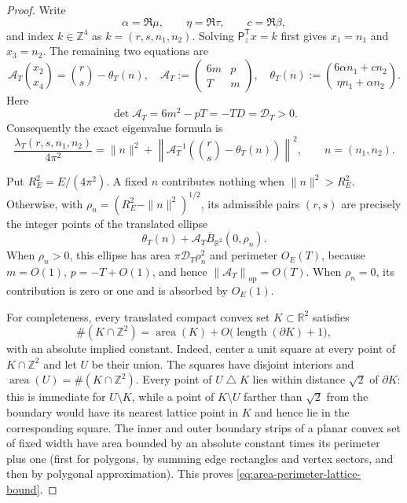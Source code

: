 \documentclass[11pt]{article}
\numberwithin{equation}{section}
\theoremstyle{definition}
\theoremstyle{remark}
\newcommand{\R}{\mathbb R}
\newcommand{\Z}{\mathbb Z}
\newcommand{\T}{\mathbb T}
\newcommand{\opnorm}[1]{\left\lVert #1\right\rVert_{\mathrm{op}}}
\begin{document}
\begin{proof}
Write
\[
 \alpha=\Re\mu,\qquad \eta=\Re\tau,\qquad c=\Re\beta,
\]
and index $k\in\Z^4$ as $k=(r,s,n_1,n_2)$.  Solving
$\mathsf P_z^{\mathsf T}x=k$ first gives $x_1=n_1$ and $x_3=n_2$.
The remaining two equations are
\begin{equation}\label{eq:counting-two-by-two-system}
 \mathcal A_T\binom{x_2}{x_4}
 =\binom{r}{s}-\theta_T(n),
 \quad
 \mathcal A_T:=\begin{pmatrix}6m&p\\T&m\end{pmatrix},
 \quad
 \theta_T(n):=\binom{6\alpha n_1+cn_2}{\eta n_1+\alpha n_2}.
\end{equation}
Here
\[
 \det\mathcal A_T=6m^2-pT=-TD=\mathcal D_T>0.
\]
Consequently the exact eigenvalue formula is
\begin{equation}\label{eq:counting-exact-eigenvalue}
 \frac{\lambda_T(r,s,n_1,n_2)}{4\pi^2}
 =\|n\|^2+
 \left\|\mathcal A_T^{-1}
 \left(\binom{r}{s}-\theta_T(n)\right)\right\|^2,
 \qquad n=(n_1,n_2).
\end{equation}

Put $R_E^2=E/(4\pi^2)$.  A fixed $n$ contributes nothing when
$\|n\|^2>R_E^2$.  Otherwise, with
$\rho_n=(R_E^2-\|n\|^2)^{1/2}$, its admissible pairs $(r,s)$ are precisely
the integer points of the translated ellipse
\begin{equation}\label{eq:counting-ellipse}
 \theta_T(n)+\mathcal A_T\overline B_{\R^2}(0,\rho_n).
\end{equation}
When $\rho_n>0$, this ellipse has area
$\pi\mathcal D_T\rho_n^2$ and perimeter $O_E(T)$, because
$m=O(1)$, $p=-T+O(1)$, and hence
$\opnorm{\mathcal A_T}=O(T)$.  When $\rho_n=0$, its contribution is zero or
one and is absorbed by $O_E(1)$.

For completeness, every translated compact convex set $K\subset\R^2$
satisfies
\begin{equation}\label{eq:area-perimeter-lattice-bound}
 \#(K\cap\Z^2)=\operatorname{area}(K)
 +O\bigl(\operatorname{length}(\partial K)+1\bigr),
\end{equation}
with an absolute implied constant.  Indeed, center a unit square at every
point of $K\cap\Z^2$ and let $U$ be their union.  The squares have disjoint
interiors and $\operatorname{area}(U)=\#(K\cap\Z^2)$.  Every point of
$U\mathbin\triangle K$ lies within distance $\sqrt2$ of $\partial K$:
this is immediate for $U\setminus K$, while a point of $K\setminus U$ farther
than $\sqrt2$ from the boundary would have its nearest lattice point in $K$
and hence lie in the corresponding square.  The inner and outer boundary
strips of a planar convex set of fixed width have area bounded by an absolute
constant times its perimeter plus one (first for polygons, by summing edge
rectangles and vertex sectors, and then by polygonal approximation).  This
proves \eqref{eq:area-perimeter-lattice-bound}.


\end{proof}
\end{document}

